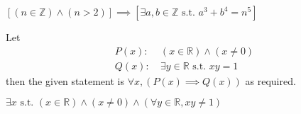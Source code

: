 \begin{questions}
    \item $\left[(n \in \mathbb{Z}) \land (n > 2)\right] \implies \left[\exists a, b \in \mathbb{Z} \text{ s.t. } a^3 + b^4 = n^5\right]$
    
    \item \begin{partquestions}{\roman*}
        \item Let
        \begin{align*}
            P(x):&\ (x \in \mathbb{R}) \land (x \neq 0)\\
            Q(x):&\ \exists y \in \mathbb{R} \text{ s.t. } xy = 1
        \end{align*}
        then the given statement is $\forall x, (P(x) \implies Q(x))$ as required.

        \item $\exists x \text{ s.t. } (x \in \mathbb{R}) \land (x \neq 0) \land (\forall y \in \mathbb{R}, xy \neq 1)$
    \end{partquestions}
\end{questions}
